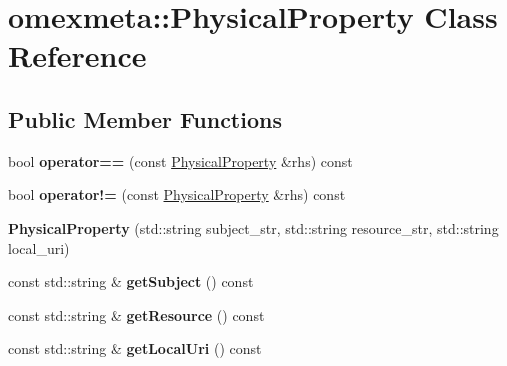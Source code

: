 \hypertarget{classomexmeta_1_1PhysicalProperty}{}\section{omexmeta\+:\+:Physical\+Property Class Reference}
\label{classomexmeta_1_1PhysicalProperty}
\subsection*{Public Member Functions}
\begin{DoxyCompactItemize}
\item 
\mbox{\label{classomexmeta_1_1PhysicalProperty_af3b3379a751ebb15f7a5ea0cae8cb4d6}} 
bool {\bfseries operator==} (const \hyperlink{classomexmeta_1_1PhysicalProperty}{Physical\+Property} \&rhs) const
\item 
\mbox{\label{classomexmeta_1_1PhysicalProperty_a1a85ba2c50f5b79e49e8a01b96756f0a}} 
bool {\bfseries operator!=} (const \hyperlink{classomexmeta_1_1PhysicalProperty}{Physical\+Property} \&rhs) const
\item 
\mbox{\label{classomexmeta_1_1PhysicalProperty_a81e8fc030e12fc1a9491a7e251312038}} 
{\bfseries Physical\+Property} (std\+::string subject\+\_\+str, std\+::string resource\+\_\+str, std\+::string local\+\_\+uri)
\item 
\mbox{\label{classomexmeta_1_1PhysicalProperty_acf399e14fd579efc6384ebc677341ead}} 
const std\+::string \& {\bfseries get\+Subject} () const
\item 
\mbox{\label{classomexmeta_1_1PhysicalProperty_a2d60b90270a6ba73646707b8c475fbb1}} 
const std\+::string \& {\bfseries get\+Resource} () const
\item 
\mbox{\label{classomexmeta_1_1PhysicalProperty_ab498df5bb21e010614ae43c0c8e70bb7}} 
const std\+::string \& {\bfseries get\+Local\+Uri} () const
\item 
\mbox{\label{classomexmeta_1_1PhysicalProperty_af4684dd78ff1b0ebf71f2f7ca94a78d9}} 

\end{DoxyCompactItemize}
